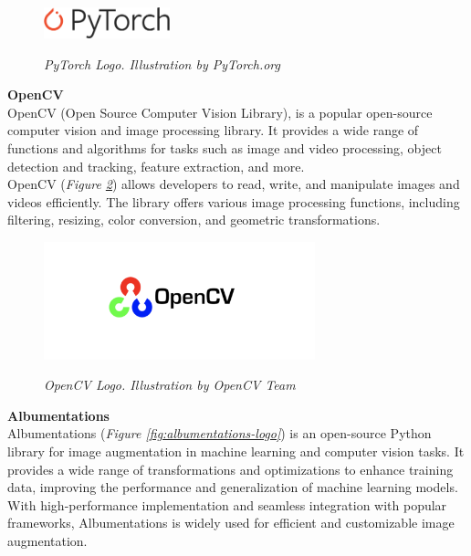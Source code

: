 \begin{figure}[H]
\centering
\includegraphics[width=0.325\textwidth]{imatges/studies_and_decisions/pytorch-logo.png}
\caption[PyTorch Logo]{\textit{PyTorch Logo. Illustration by PyTorch.org}}
{\label{fig:pytorch-logo}}
\end{figure}

\vspace{0.5cm}
\textbf{OpenCV} \\

OpenCV (Open Source Computer Vision Library), is a popular open-source computer vision and image processing library. It provides a wide range of functions and algorithms for tasks such as image and video processing, object detection and tracking, feature extraction, and more. \\

OpenCV (\textit{Figure \ref{fig:opencv-logo}}) allows developers to read, write, and manipulate images and videos efficiently. The library offers various image processing functions, including filtering, resizing, color conversion, and geometric transformations.

\begin{figure}[H]
\centering
\begin{adjustbox}{trim=1cm 1cm 1cm 1cm, clip}
\includegraphics[width=0.7\textwidth]{imatges/studies_and_decisions/OpenCV-logo.png}
\end{adjustbox}
\caption[OpenCV Logo]{\textit{OpenCV Logo. Illustration by OpenCV Team}}
{\label{fig:opencv-logo}}
\end{figure}


\vspace{0.5cm}
\textbf{Albumentations} \\

Albumentations (\textit{Figure \ref{fig:albumentations-logo}}) is an open-source Python library for image augmentation in machine learning and computer vision tasks. It provides a wide range of transformations and optimizations to enhance training data, improving the performance and generalization of machine learning models. With high-performance implementation and seamless integration with popular frameworks, Albumentations is widely used for efficient and customizable image augmentation.

